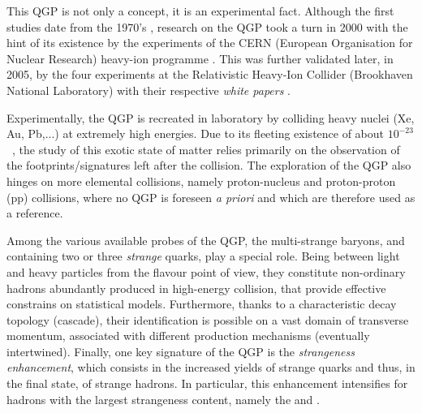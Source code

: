 This QGP is not only a concept, it is an experimental fact. Although the first studies date from the 1970's \cite{carruthersQuarkiumBizarreFermi1974}\cite{harringtonHighDensityPhaseTransitions1974}\cite{collinsSuperdenseMatterNeutrons1975}, research on the QGP took a turn in 2000 with the hint of its existence by the experiments of the CERN (European Organisation for Nuclear Research) heavy-ion programme \cite{cernNewStateMatter2023}. This was further validated later, in 2005, by the four experiments at the Relativistic Heavy-Ion Collider (Brookhaven National Laboratory) with their respective \emph{white papers} \cite{ludlamHUNTINGQUARKGLUON2005}\cite{arseneQuarkGluonPlasma2005}\cite{backPHOBOSPerspectiveDiscoveries2005}\cite{phenixcollaborationFormationDensePartonic2005}\cite{starcollaborationExperimentalTheoreticalChallenges2005}.

Experimentally, the QGP is recreated in laboratory by colliding heavy nuclei (Xe, Au, Pb,...) at extremely high energies. Due to its fleeting existence of about $10^{-23}$~\second, the study of this exotic state of matter relies primarily on the observation of the footprints/signatures left after the collision. The exploration of the QGP also hinges on more elemental collisions, namely proton-nucleus and proton-proton (pp) collisions, where no QGP is foreseen \emph{a priori} and which are therefore used as a reference.

Among the various available probes of the QGP, the multi-strange baryons, \rmXi and \rmOmega containing two or three \textit{strange} quarks, play a special role. Being between light and heavy particles from the flavour point of view, they constitute non-ordinary hadrons abundantly produced in high-energy collision, that provide effective constrains on statistical models. Furthermore, thanks to a characteristic decay topology (cascade), their identification is possible on a vast domain of transverse momentum, associated with different production mechanisms (eventually intertwined). Finally, one key signature of the QGP is the \textit{strangeness enhancement}, which consists in the increased yields of strange quarks and thus, in the final state, of strange hadrons. In particular, this enhancement intensifies for hadrons with the largest strangeness content, namely the \rmXi and \rmOmega.\\

